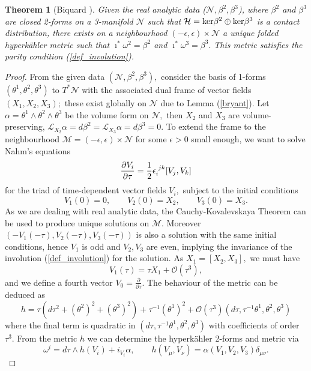 \documentclass[a4paper,12pt, onecolumn, notitlepage]{article}
\newtheorem{thm}{Theorem}[]
\theoremstyle{definition}
\theoremstyle{remark}
\newcommand{\al}{\alpha}
\newcommand{\w}{\omega}
\newcommand{\m}{\mu}
\newcommand{\n}{\nu}
\newcommand{\e}{\epsilon}
\newcommand{\ddt}[1]{\frac{\partial #1}{\partial \tau}}
\newcommand{\HK}{hyperk\"ahler }
\begin{document}
\begin{thm}[Biquard \cite{biquard_2015}]
	Given the real analytic data ($\mathcal{N}, \beta^{2}, \beta^{3}$), where $\beta^{2}$ and $\beta^{3}$ are closed 2-forms on a 3-manifold $\mathcal{N}$ such that $\mathcal{H}=\textnormal{ker}\beta^{2}\oplus\textnormal{ker}\beta^{3}$ is a contact distribution, there exists on a neighbourhood $(-\e,\e)\times\mathcal{N}$ a unique folded \HK metric such that $\imath^{\ast}\w^{2}=\beta^{2}$ and $\imath^{\ast}\w^{3}=\beta^{3}.$ This metric satisfies the parity condition (\ref{def_involution}).
\end{thm}
\begin{proof}
	From the given data $(\mathcal{N},\beta^{2},\beta^{3}),$ consider the basis of 1-forms $(\theta^{1},\theta^{2},\theta^{3})$ to $T^{\ast}\mathcal{N}$ with the associated dual frame of vector fields $(X_{1},X_{2},X_{3});$ these exist globally on $\mathcal{N}$ due to Lemma (\ref{bryant}). Let $\al=\theta^{1}\wedge\theta^{2}\wedge\theta^{3}$ be the volume form on $\mathcal{N},$ then $X_{2}$ and $X_{3}$ are volume-preserving, $\mathcal{L}_{X_2}\al=d\beta^{2}=\mathcal{L}_{X_3}\al=d\beta^{3}=0.$ To extend the frame to the neighbourhood $\mathcal{M}=(-\e,\e)\times\mathcal{N}$ for some $\e>0$ small enough, we want to solve Nahm's equations
	\begin{equation*}
		\ddt{V_{i}}=\frac{1}{2}\e\indices{_i^j^k}[V_{j},V_{k}]
	\end{equation*}
	for the triad of time-dependent vector fields $V_{i},$ subject to the initial conditions
	\begin{equation*}
		V_{1}(0)=0,\qquad V_{2}(0)=X_{2},\qquad V_{3}(0) = X_{3}.
	\end{equation*}
	As we are dealing with real analytic data, the Cauchy-Kovalevskaya Theorem can be used to produce unique solutions on $\mathcal{M}.$ Moreover $(-V_{1}(-\tau),V_{2}(-\tau),V_{3}(-\tau))$ is also a solution with the same initial conditions, hence $V_{1}$ is odd and $V_{2}, V_{3}$ are even, implying the invariance of the involution (\ref{def_involution}) for the solution. As $X_{1}=[X_{2},X_{3}],$ we must have
	\begin{equation*}
		V_{1}(\tau) = \tau X_{1} + \mathcal{O}(\tau^{3}),
	\end{equation*}
	and we define a fourth vector $V_{0}=\ddt{}.$ The behaviour of the metric can be deduced as
	\begin{equation}
		h = \tau(d\tau^{2}+(\theta^{2})^{2} + (\theta^{3})^{2}) + \tau^{-1}(\theta^{1})^{2} + \mathcal{O}(\tau^{3})(d\tau,\tau^{-1}\theta^{1},\theta^{2},\theta^{3})
	\end{equation}
	where the final term is quadratic in $(d\tau,\tau^{-1}\theta^{1},\theta^{2},\theta^{3})$ with coefficients of order $\tau^{3}.$ From the metric $h$ we can determine the \HK 2-forms and metric via
	\begin{equation}
		\w^{i}=d\tau\wedge h(V_{i}) + i_{V_{i}}\al,\qquad h(V_{\m},V_{\n})=\al(V_{1},V_{2},V_{3})\delta_{\m\n}.
	\end{equation}
\end{proof}
\end{document}
